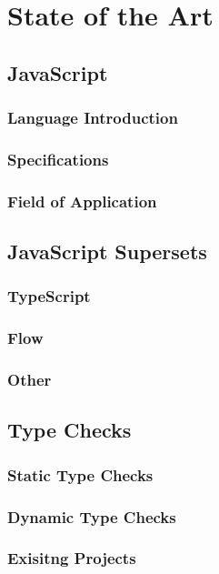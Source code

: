 
\chapter{State of the Art}
\label{cha:state_of_the_art}

\section{JavaScript}
\label{sec:javascript}

\subsection{Language Introduction}
\label{sec:javascript_language_introduction}

\subsection{Specifications}
\label{sec:javascript_specifications}

\subsection{Field of Application}
\label{sec:javascript_field_of_application}

\section{JavaScript Supersets}
\label{sec:javascript_supersets}

\subsection{TypeScript}
\label{sec:typescript}

\subsection{Flow}
\label{sec:flow}

\subsection{Other}
\label{sec:other_supersets}

\section{Type Checks}
\label{sec:type_checks}

\subsection{Static Type Checks}
\label{sec:static_type_checks}

\subsection{Dynamic Type Checks}
\label{sec:dynamic_type_checks}

\subsection{Exisitng Projects}
\label{sec:existing_projects}